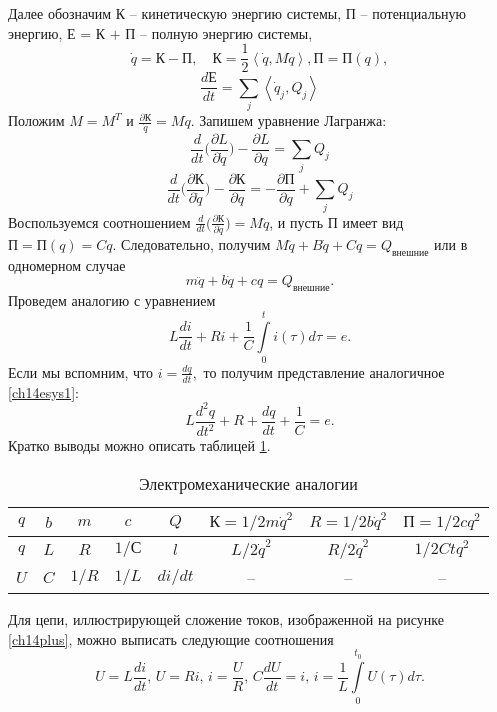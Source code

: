 Далее обозначим К -- кинетическую энергию системы, П -- потенциальную энергию, $ \text{Е = К + П} $ -- полную энергию системы,
$$ \dot q = \text{К} - \text{П}, \quad  \text{К}  = \frac{1}{2}\left< \dot q, M \dot q \right>,  \text{П} = \text{П}(q),$$
$$ \frac{d\text{Е}}{dt} = \sum\limits_j \left< \dot q_j , Q_j\right>$$
Положим $M = M^T$ и $ \frac{\partial \text{К}}{\dot q } = M \dot q.$
Запишем уравнение Лагранжа:
$$ \frac{d}{dt} \Big (\frac{\partial L}{\partial \dot q} \Big) -  \frac{\partial L}{\partial q} = \sum\limits_j Q_j$$
$$ \frac{d}{dt}  \Big ( \frac{\partial  \text{К} }{\partial \dot q}  \Big )  -  \frac{\partial  \text{К} }{\partial q}  = - \frac{\partial  \text{П} }{\partial q} + \sum\limits_j  Q_j$$
Воспользуемся соотношением $ \frac{d}{dt}  \Big ( \frac{\partial  \text{К} }{\partial \dot q}  \Big ) = M \ddot q$, и пусть П  имеет вид $\text{П} = \text{П}(q) = Cq.$ Следовательно, получим $  M \ddot q + B \dot q + C q = Q_{\text{внешние}}$ или в одномерном случае
\begin{equation} \label{ch14esys1}
 m \ddot q + b \dot q + c q = Q_{\text{внешние}}.
 \end{equation}
Проведем аналогию с уравнением
$$ L \frac{di}{dt} + R i + \frac{1}{C} \int\limits_0^t i(\tau) d\tau = e.$$
Если мы вспомним, что $i = \frac{dq}{dt}, $ то получим представление аналогичное \eqref{ch14esys1}:
$$ L \frac{d^2 q}{dt^2} + R + \frac{d q}{dt}+ \frac{1}{C} = e.$$ 
Кратко выводы можно описать таблицей \ref{ch14t1}.

\begin{table}
\begin{center}
\begin{tabular}{|c|c|c|c|c|c|c|c|}
\hline $q$& $b$ & $m$ & $c$ & $Q$ & $\text{К} = 1/2 m\dot q^2$  & $R =1/2 b\dot q^2$ & $\text{П} = 1/2 c q^2$ \\
\hline $q$ & $L$  & $R$ & $1/С$ & $l$ & $L/2  \dot q^2$ & $R/2  \dot q^2$ & $1/2C t q^2$    \\
\hline $U$ & $C $ & $1/R$ & $1/L$ & $di/dt$ & -- & -- & --  \\
\hline
\end{tabular}
\end{center}
\caption{Электромеханические аналогии }\label{ch14t1}
\end{table}

Для цепи, иллюстрирующей сложение токов, изображенной на рисунке \ref{ch14plus}, можно выписать следующие соотношения 
$$U =  L \frac{di}{dt}, \,U = Ri, \, i = \frac{U}{R}, \, C \frac{dU}{dt} = i,  \, i = \frac{1}{L}\int\limits_0^{t_0} U(\tau) d\tau.$$

